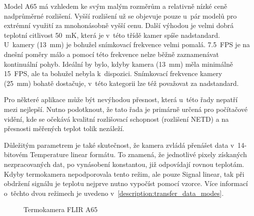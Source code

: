   	Model A65 má vzhledem ke svým malým rozměrům a relativně nízké ceně nadprůměrné rozlišení. Vyšší rozlišení už se objevuje pouze u~pár modelů pro extrémní využití za mnohonásobně vyšší cenu. Další výhodou je velmi dobrá teplotní citlivost 50~mK, která je v~této třídě kamer spíše nadstandard. U~kamery (13~mm) je bohužel snímkovací frekvence velmi pomalá. 7.5~FPS je na dnešní poměry málo a pomocí této frekvence nelze běžně zaznamenávat kontinuální pohyb. Ideální by bylo, kdyby kamera (13~mm) měla minimálně 15~FPS, ale ta bohužel nebyla k~dispozici. Snímkovací frekvence kamery (25~mm) bohatě dostačuje, v~této kategorii lze též považovat za nadstandard. 
    
    Pro některé aplikace může být nevýhodou přesnost, která u~této řady nepatří mezi nejlepší. Nutno podotknout, že tato řada je primárně určená pro počítačové vidění, kde se očekává kvalitní rozlišovací schopnost (rozlišení NETD) a na přesnosti měřených teplot tolik nezáleží.

  Důležitým parametrem je také skutečnost, že kamera zvládá přenášet data v~14-bitovém Temperature linear formátu. To znamená, že jednotlivé pixely získaných nezpracovaných dat, po vynásobení konstantou, již odpovídají rovnou teplotám. Kdyby termokamera nepodporovala tento režim, ale pouze Signal linear, tak při obdržení signálu je teplotu nejprve nutno vypočíst pomocí vzorce. Více informací o~těchto dvou režimech je uvedeno v~\ref{description:transfer_data_modes}. 


  	\begin{figure}[h]
      \qquad
      \caption{Termokamera FLIR A65}
      \label{fig:flir_a65}
  	\end{figure}

